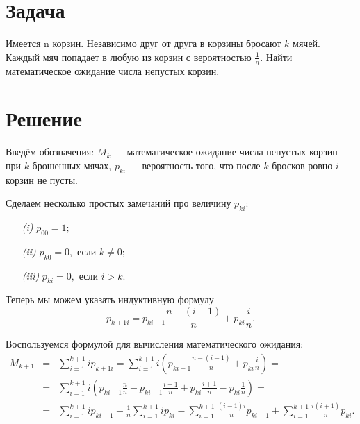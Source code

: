 \documentclass[draft]{article}
\begin{document}
\section{Задача}

Имеется n корзин. Независимо друг от друга в корзины бросают $k$ мячей. Каждый мяч попадает в любую из корзин с вероятностью $\frac{1}{n}$. Найти математическое ожидание числа непустых корзин.

\section{Решение}

Введём обозначения: $M_k$ --- математическое ожидание числа непустых корзин при $k$ брошенных мячах, $p_{{k}{i}}$ --- вероятность того, что после $k$ бросков ровно $i$ корзин не пусты.

Сделаем несколько простых замечаний про величину $p_{{k}{i}}$:
\begin{itemize}
\item[\it(i)]   $p_{{0}{0}} = 1;$
\item[\it(ii)]  $p_{{k}{0}} = 0,$ если $k \not= 0;$
\item[\it(iii)] $p_{{k}{i}} = 0,$ если $i > k.$
\end{itemize}

Теперь мы можем указать индуктивную формулу
\[
  p_{{k+1}{i}} = p_{{k}{i-1}}\frac{n-(i-1)}{n} + p_{{k}{i}}\frac{i}{n}.
\]

Воспользуемся формулой для вычисления математического ожидания:
\begin{eqnarray*}
  M_{k+1} & = & \sum_{i=1}^{k+1}{i p_{{k+1}{i}}} = \sum_{i=1}^{k+1}{i (p_{{k}{i-1}}\frac{n-(i-1)}{n} + p_{{k}{i}}\frac{i}{n})} = \\
          & = & \sum_{i=1}^{k+1}{i (p_{{k}{i-1}}\frac{n}{n} - p_{{k}{i-1}}\frac{i-1}{n} + p_{{k}{i}}\frac{i+1}{n} - p_{{k}{i}}\frac{1}{n})} = \\
          & = & \sum_{i=1}^{k+1}{i p_{{k}{i-1}} - \frac{1}{n}\sum_{i=1}^{k+1}{i p_{{k}{i}}}} - \sum_{i=1}^{k+1}{\frac{(i-1)i}{n} p_{{k}{i - 1}}} + \sum_{i=1}^{k+1}{\frac{i(i+1)}{n} p_{{k}{i}}}.
\end{eqnarray*}
\end{document}
